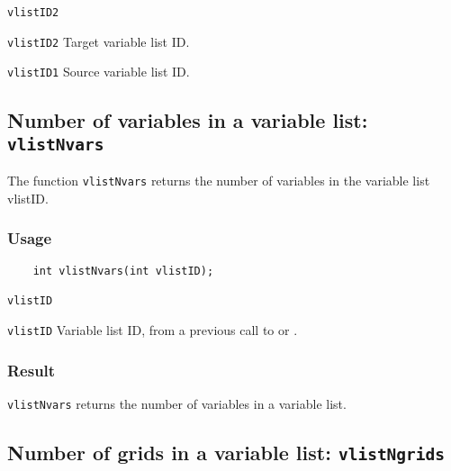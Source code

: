 \hspace*{4mm}\begin{minipage}[]{15cm}
\begin{deflist}{\texttt{vlistID2}\ }
\item[\texttt{vlistID2}]
Target variable list ID.
\item[\texttt{vlistID1}]
Source variable list ID.

\end{deflist}
\end{minipage}


\subsection{Number of variables in a variable list: \texttt{vlistNvars}}
\label{vlistNvars}

The function {\texttt{vlistNvars}} returns the number of variables in the variable list vlistID.

\subsubsection*{Usage}

\begin{verbatim}
    int vlistNvars(int vlistID);
\end{verbatim}

\hspace*{4mm}\begin{minipage}[]{15cm}
\begin{deflist}{\texttt{vlistID}\ }
\item[\texttt{vlistID}]
Variable list ID, from a previous call to {} or {}.

\end{deflist}
\end{minipage}

\subsubsection*{Result}

{\texttt{vlistNvars}} returns the number of variables in a variable list.



\subsection{Number of grids in a variable list: \texttt{vlistNgrids}}
\label{vlistNgrids}

